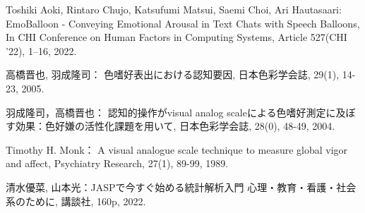 \documentclass[11pt,a4paper]{ltjsreport}
\makeatletter
\renewcommand{\chapter}{%
    \if@openleft\cleardoublepage\else
    \if@openright\cleardoublepage\else\clearpage\fi\fi
    \global\@topnum\z@
    \if@english \@afterindentfalse \else \@afterindenttrue \fi
    \secdef
    {\@omit@numberfalse\@chapter}%
    {\@omit@numbertrue\@schapter}}
\makeatother
\begin{document}
\begin{thebibliography}{99}
    Toshiki Aoki, Rintaro Chujo, Katsufumi Matsui, Saemi Choi, Ari Hautasaari:
    EmoBalloon - Conveying Emotional Arousal in Text Chats with Speech Balloons,
    In CHI Conference on Human Factors in Computing Systems, Article 527(CHI '22), 1–16, 2022.

    高橋晋也, 羽成隆司： 色嗜好表出における認知要因, 
    日本色彩学会誌, 29(1), 14-23, 2005.

    羽成隆司，高橋晋也： 認知的操作がvisual analog scaleによる色嗜好測定に及ぼす効果：色好嫌の活性化課題を用いて, 
    日本色彩学会誌, 28(0), 48-49, 2004.

    Timothy H. Monk： A visual analogue scale technique to measure global vigor and affect, 
    Psychiatry Research, 27(1), 89-99, 1989. 

    清水優菜, 山本光：JASPで今すぐ始める統計解析入門 心理・教育・看護・社会系のために, 
    講談社, 160p, 2022.




\end{thebibliography}

\newpage
\appendix         %
\pagestyle{fancy}
\fancyhead{} %
\renewcommand{\chaptermark}[1]{\lhead{付録\ \thechapter\ ~~~#1}{}}
\chead{} %
\rhead{\thepage} %
\lfoot{} %
\cfoot{} %
\renewcommand{\footrulewidth}{0.5pt} %

\titleformat{\chapter}[display]{\huge\bfseries}{付録\ \thechapter}{20pt}{}[]
\end{document}
